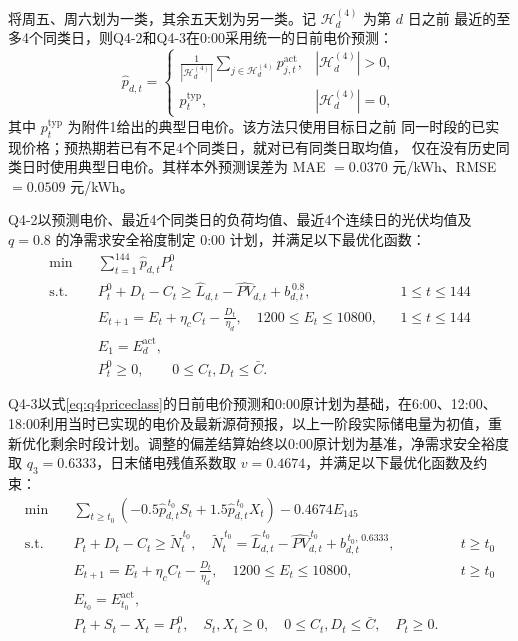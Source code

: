 \documentclass[withoutpreface,bwprint]{cumcmthesis}
\begin{document}
将周五、周六划为一类，其余五天划为另一类。记 $\mathcal H_d^{(4)}$ 为第 $d$ 日之前
最近的至多4个同类日，则Q4-2和Q4-3在0:00采用统一的日前电价预测：
\begin{equation}
\hat p_{d,t}=
\begin{cases}
\displaystyle\frac{1}{|\mathcal H_d^{(4)}|}
\sum_{j\in\mathcal H_d^{(4)}}p^{\mathrm{act}}_{j,t},
& |\mathcal H_d^{(4)}|>0,\\[8pt]
p^{\mathrm{typ}}_t,
& |\mathcal H_d^{(4)}|=0,
\end{cases}
\label{eq:q4priceclass}
\end{equation}
其中 $p^{\mathrm{typ}}_t$ 为附件1给出的典型日电价。该方法只使用目标日之前
同一时段的已实现价格；预热期若已有不足4个同类日，就对已有同类日取均值，
仅在没有历史同类日时使用典型日电价。其样本外预测误差为
MAE $=0.0370$ 元/kWh、RMSE $=0.0509$ 元/kWh。

Q4-2以预测电价、最近4个同类日的负荷均值、最近4个连续日的光伏均值及
$q=0.8$ 的净需求安全裕度制定 0:00 计划，并满足以下最优化函数：
\begin{align}
\min\quad & \sum_{t=1}^{144}\hat p_{d,t}P_t^0
\label{eq:q42_obj}\\
\text{s.t.}\quad
& P_t^0+D_t-C_t\geq
\hat L_{d,t}-\widehat{PV}_{d,t}+b_{d,t}^{\,0.8},
&& 1\leq t\leq144
\label{eq:q42_bal}\\
& E_{t+1}=E_t+\eta_cC_t-\frac{D_t}{\eta_d},
\quad 1200\leq E_t\leq10800,
&& 1\leq t\leq144
\label{eq:q42_soc}\\
& E_1=E_d^{\mathrm{act}},
\label{eq:q42_initial}\\
& P_t^0\geq0,\qquad 0\leq C_t,D_t\leq\bar C.
\label{eq:q42_bounds}
\end{align}

Q4-3以式\eqref{eq:q4priceclass}的日前电价预测和0:00原计划为基础，在6:00、12:00、18:00利用当时已实现的电价及最新源荷预报，以上一阶段实际储电量为初值，重新优化剩余时段计划。调整的偏差结算始终以0:00原计划为基准，净需求安全裕度取 \(q_3=0.6333\)，日末储电残值系数取 \(v=0.4674\)，并满足以下最优化函数及约束：
\begin{align}
\min\quad &
\sum_{t\geq t_0}
\left(-0.5\hat p_{d,t}^{\,t_0}S_t
+1.5\hat p_{d,t}^{\,t_0}X_t\right)
-0.4674E_{145}
\label{eq:q43_obj}\\
\text{s.t.}\quad
& P_t+D_t-C_t\geq\widetilde N_t^{\,t_0},
\quad
\widetilde N_t^{\,t_0}
=\hat L_{d,t}^{\,t_0}
-\widehat{PV}_{d,t}^{\,t_0}
+b_{d,t}^{\,t_0,\,0.6333},
&& t\geq t_0
\label{eq:q43_bal}\\
& E_{t+1}=E_t+\eta_cC_t-\frac{D_t}{\eta_d},
\quad 1200\leq E_t\leq10800,
&& t\geq t_0
\label{eq:q43_soc}\\
& E_{t_0}=E_{t_0}^{\mathrm{act}},
\label{eq:q43_initial}\\
& P_t+S_t-X_t=P_t^0,\quad S_t,X_t\geq0,
\quad 0\leq C_t,D_t\leq\bar C,\quad P_t\geq0.
\label{eq:q43_link}
\end{align}
\end{document}
